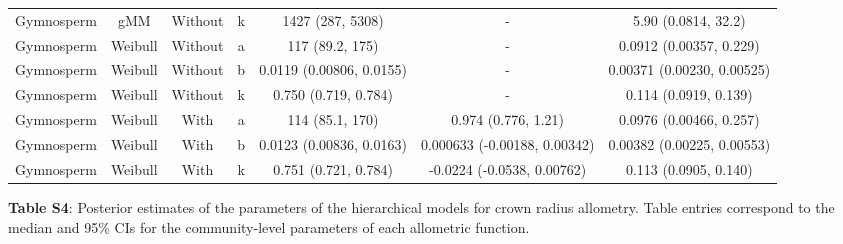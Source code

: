 \documentclass[
  12pt,
  letterpaper,
  DIV=11,
  numbers=noendperiod]{scrartcl}
\begin{document}
\begin{longtable*}[t]{ccccccc}
Gymnosperm & gMM & Without & k & 1427 (287, 5308) & - & 5.90 (0.0814, 32.2)\\
Gymnosperm & Weibull & Without & a & 117 (89.2, 175) & - & 0.0912 (0.00357, 0.229)\\
Gymnosperm & Weibull & Without & b & 0.0119 (0.00806, 0.0155) & - & 0.00371 (0.00230, 0.00525)\\
Gymnosperm & Weibull & Without & k & 0.750 (0.719, 0.784) & - & 0.114 (0.0919, 0.139)\\
Gymnosperm & Weibull & With & a & 114 (85.1, 170) & 0.974 (0.776, 1.21) & 0.0976 (0.00466, 0.257)\\
\addlinespace
Gymnosperm & Weibull & With & b & 0.0123 (0.00836, 0.0163) & 0.000633 (-0.00188, 0.00342) & 0.00382 (0.00225, 0.00553)\\
Gymnosperm & Weibull & With & k & 0.751 (0.721, 0.784) & -0.0224 (-0.0538, 0.00762) & 0.113 (0.0905, 0.140)\\
\bottomrule
\end{longtable*}
\endgroup{}

\newpage

\textbf{Table S4}: Posterior estimates of the parameters of the
hierarchical models for crown radius allometry. Table entries correspond
to the median and 95\% CIs for the community-level parameters of each
allometric function.

\begingroup\fontsize{10}{12}\selectfont
\end{document}
